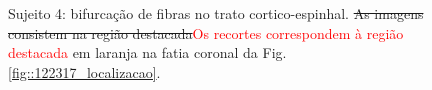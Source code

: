  \begin{figure}[H]
\centering
    \hfill
    \caption{Sujeito 4: bifurcação de fibras no trato cortico-espinhal. \sout{As imagens consistem na região destacada}\textcolor{red}{Os recortes correspondem à região destacada} em laranja na fatia coronal da Fig. \ref{fig::122317_localizacao}.
    }
    \label{fig::122317_fanning}
\end{figure}

